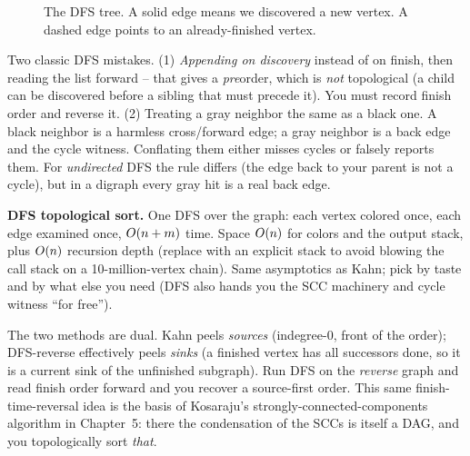 \begin{figure}[htbp]
\centering
{}
\caption{The DFS tree. A solid edge means we discovered a new vertex. A dashed edge points to an already-finished vertex.}
\label{fig:ch04-dfs-tree}
\end{figure}

\begin{trapbox}
Two classic DFS mistakes. (1) \emph{Appending on discovery} instead of on finish, then reading the
list forward -- that gives a \emph{pre}order, which is \emph{not} topological (a child can be
discovered before a sibling that must precede it). You must record finish order and reverse it.
(2) Treating a gray neighbor the same as a black one. A black neighbor is a harmless cross/forward
edge; a gray neighbor is a back edge and the cycle witness. Conflating them either misses cycles or
falsely reports them. For \emph{undirected} DFS the rule differs (the edge back to your parent is not
a cycle), but in a digraph every gray hit is a real back edge.
\end{trapbox}

\begin{complexitybox}
\textbf{DFS topological sort.} One DFS over the graph: each vertex colored once, each edge examined
once, $O(n+m)$ time. Space $O(n)$ for colors and the output stack, plus $O(n)$ recursion depth
(replace with an explicit stack to avoid blowing the call stack on a 10-million-vertex chain). Same
asymptotics as Kahn; pick by taste and by what else you need (DFS also hands you the SCC machinery
and cycle witness ``for free'').
\end{complexitybox}

\begin{connectionbox}
The two methods are dual. Kahn peels \emph{sources} (indegree-$0$, front of the order); DFS-reverse
effectively peels \emph{sinks} (a finished vertex has all successors done, so it is a current sink of
the unfinished subgraph). Run DFS on the \emph{reverse} graph and read finish order forward and you
recover a source-first order. This same finish-time-reversal idea is the basis of Kosaraju's
strongly-connected-components algorithm in Chapter~5: there the condensation of the SCCs is itself a
DAG, and you topologically sort \emph{that}.
\end{connectionbox}

